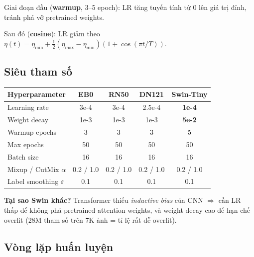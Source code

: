 \documentclass[11pt,a4paper]{article}
\begin{document}
Giai đoạn đầu (\textbf{warmup}, 3--5 epoch): LR tăng tuyến tính từ 0 lên giá trị đỉnh, tránh phá vỡ pretrained weights.

Sau đó (\textbf{cosine}): LR giảm theo $\eta(t) = \eta_{\min} + \frac{1}{2}(\eta_{\max} - \eta_{\min})(1 + \cos(\pi t / T))$.

\subsection{Siêu tham số}

\begin{table}[h]
\centering\small
\begin{tabular}{lcccc}
\toprule
\textbf{Hyperparameter} & \textbf{EB0} & \textbf{RN50} & \textbf{DN121} & \textbf{Swin-Tiny} \\
\midrule
Learning rate       & 3e-4  & 3e-4 & 2.5e-4 & \textbf{1e-4} \\
Weight decay        & 1e-3  & 1e-3 & 1e-3   & \textbf{5e-2} \\
Warmup epochs       & 3     & 3    & 3      & 5 \\
Max epochs          & 50    & 50   & 50     & 50 \\
Batch size          & 16    & 16   & 16     & 16 \\
Mixup / CutMix $\alpha$ & 0.2 / 1.0 & 0.2 / 1.0 & 0.2 / 1.0 & 0.2 / 1.0 \\
Label smoothing $\varepsilon$ & 0.1 & 0.1 & 0.1 & 0.1 \\
\bottomrule
\end{tabular}
\end{table}

\textbf{Tại sao Swin khác?} Transformer thiếu \textit{inductive bias} của CNN $\Rightarrow$ cần LR thấp để không phá pretrained attention weights, và weight decay cao để hạn chế overfit (28M tham số trên 7K ảnh = tỉ lệ rất dễ overfit).

\subsection{Vòng lặp huấn luyện}
\end{document}
